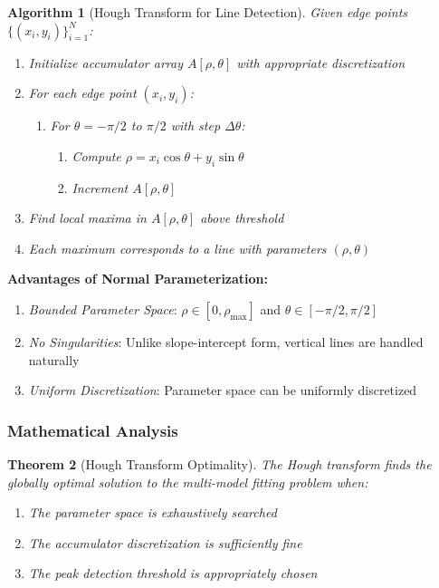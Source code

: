 \documentclass[12pt]{article}
\newtheorem{theorem}{Theorem}[section]
\newtheorem{algorithm}[theorem]{Algorithm}
\begin{document}
\begin{algorithm}[Hough Transform for Line Detection]
    \label{alg:hough_lines}
    Given edge points $\{(x_i, y_i)\}_{i=1}^N$:
    \begin{enumerate}
        \item Initialize accumulator array $A[\rho, \theta]$ with appropriate discretization
        \item For each edge point $(x_i, y_i)$:
              \begin{enumerate}
                  \item For $\theta = -\pi/2$ to $\pi/2$ with step $\Delta\theta$:
                        \begin{enumerate}
                            \item Compute $\rho = x_i \cos \theta + y_i \sin \theta$
                            \item Increment $A[\rho, \theta]$
                        \end{enumerate}
              \end{enumerate}
        \item Find local maxima in $A[\rho, \theta]$ above threshold
        \item Each maximum corresponds to a line with parameters $(\rho, \theta)$
    \end{enumerate}
\end{algorithm}

\textbf{Advantages of Normal Parameterization:}
\begin{enumerate}
    \item \textit{Bounded Parameter Space}: $\rho \in [0, \rho_{\max}]$ and $\theta \in [-\pi/2, \pi/2]$
    \item \textit{No Singularities}: Unlike slope-intercept form, vertical lines are handled naturally
    \item \textit{Uniform Discretization}: Parameter space can be uniformly discretized
\end{enumerate}

\subsubsection{Mathematical Analysis}
\label{subsubsec:hough_analysis}

\begin{theorem}[Hough Transform Optimality]
    \label{thm:hough_optimality}
    The Hough transform finds the globally optimal solution to the multi-model fitting problem when:
    \begin{enumerate}
        \item The parameter space is exhaustively searched
        \item The accumulator discretization is sufficiently fine
        \item The peak detection threshold is appropriately chosen
    \end{enumerate}
\end{theorem}
\end{document}

